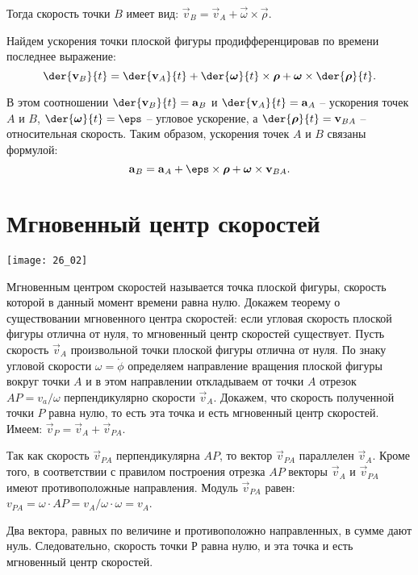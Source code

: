 Тогда скорость точки \( B \) имеет вид: \( \vec{v}_B = \vec{v}_A +
\vec{\omega}\times\vec{\rho} \).

Найдем ускорения точки плоской фигуры продифференцировав по времени последнее
выражение:
\[
    \der{\vec{v}_B}{t} = \der{\vec{v}_A}{t} + \der{\vec{\omega}}{t}\times
    \vec{\rho} + \vec{\omega}\times\der{\vec{\rho}}{t}.
\]
 
В этом соотношении \( \ds \der{\vec{v}_B}{t} = \vec{a}_B \) и
\( \ds \der{\vec{v}_A}{t} = \vec{a}_A \) -- ускорения точек \( A \) и \( B \),
\( \ds \der{\vec{\omega}}{t} = \vec{\eps} \) -- угловое ускорение, а
\( \ds \der{\vec{\rho}}{t} = \vec{v}_{BA} \) -- относительная скорость. Таким
образом, ускорения точек \( A \) и \( B \) связаны формулой:
\[
    \vec{a}_B = \vec{a}_A + \vec{\eps}\times\vec{\rho} +
    \vec{\omega}\times\vec{v}_{BA}.
\]

\section{Мгновенный центр скоростей}

\begin{minipage}{.4\textwidth}
    \texttt{[image: 26\_02]}
\end{minipage}
\begin{minipage}{.55\textwidth}
Мгновенным центром скоростей называется точка плоской фигуры, скорость которой в
данный момент времени равна нулю. Докажем теорему о существовании мгновенного
центра скоростей: если угловая скорость плоской фигуры отлична от нуля, то
мгновенный центр скоростей существует. Пусть скорость \( \vec{v}_A \)
произвольной точки плоской фигуры отлична от нуля. По знаку угловой скорости
\( \omega = \dot{\phi} \) определяем направление вращения плоской фигуры вокруг
точки \( A \) и в этом направлении откладываем от точки \( A \) отрезок
\( AP = v_a/\omega \) перпендикулярно скорости \( \vec{v}_A \).
Докажем, что скорость полученной точки \( P \) равна нулю, то есть эта точка и
есть мгновенный центр скоростей. Имеем: \( \vec{v}_P = \vec{v}_A +
\vec{v}_{PA} \).
\end{minipage}
 
Так как скорость \( \vec{v}_{PA} \) перпендикулярна \( AP \), то вектор
\( \vec{v}_{PA} \) параллелен \( \vec{v}_A \). Кроме того, в соответствии с
правилом построения отрезка \( AP \) векторы \( \vec{v}_A \) и
\( \vec{v}_{PA} \) имеют противоположные направления. Модуль \( \vec{v}_{PA} \)
равен: \( v_{PA} = \omega\cdot AP = v_A/\omega\cdot\omega = v_A \).

Два вектора, равных по величине и противоположно направленных, в сумме дают нуль.
Следовательно, скорость точки Р равна нулю, и эта точка и есть мгновенный центр
скоростей.

\newpage %
